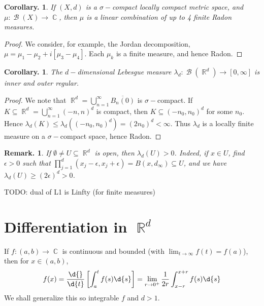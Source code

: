 \documentclass[11pt, a4paper]{memoir}
\DeclareMathOperator{\R}{{\mathbb{R}}}
\DeclareMathOperator{\C}{{\mathbb{C}}}
\theoremstyle{change}
\newtheorem{corollary}[theorem]{Corollary.}
\theoremstyle{plain}
\theoremstyle{nonumberplain}
\newtheorem{remark}{Remark.}
\newtheorem{proof}{Proof}
\DeclareMathOperator{\B}{{\mathcal{B}}}
\begin{document}
\begin{corollary}
    If $(X,d)$ is a $\sigma-$compact locally compact metric space, and $\mu:\B(X)\to\C$, then $\mu$ is a linear combination of up to 4 finite Radon measures.
\end{corollary}
\begin{proof}
    We consider, for example, the Jordan decomposition, $\mu=\mu_1-\mu_2+i[\mu_3-\mu_4]$.
    Each $\mu_k$ is a finite measure, and hence Radon.
\end{proof}
\begin{corollary}
    The $d-$dimensional Lebesgue measure $\lambda_d:\B(\R^d)\to[0,\infty]$ is inner and outer regular.
\end{corollary}
\begin{proof}
    We note that $\R^d=\bigcup_{n=1}^\infty\overline{B_n(0)}$ is $\sigma-$compact.
    If $K\subseteq\R^d=\bigcup_{n=1}^\infty(-n,n)^d$ is compact, then $K\subseteq(-n_0,n_0)^d$ for some $n_0$.
    Hence $\lambda_d(K)\leq\lambda_d((-n_0,n_0)^d)=(2n_0)^d<\infty$.
    Thus $\lambda_d$ is a locally finite measure on a $\sigma-$compact space, hence Radon.
\end{proof}
\begin{remark}
    If $\emptyset\neq U\subseteq\R^d$ is open, then $\lambda_d(U)>0$.
    Indeed, if $x\in U$, find $\epsilon>0$ such that $\prod_{j=1}^d(x_j-\epsilon,x_j+\epsilon)=B(x,d_\infty)\subseteq U$, and we have $\lambda_d(U)\geq(2\epsilon)^d>0$.
\end{remark}
TODO: dual of L1 is Linfty (for finite measures)
\section{Differentiation in \texorpdfstring{$\R^d$}{Rd}}
If $f:(a,b)\to\C$ is continuous and bounded (with $\lim_{t\to\infty}f(t)=f(a)$), then for $x\in(a,b)$,
\begin{equation*}
    f(x)=\frac{\d{}}{\d{t}}\left[\int_a^t f(s)\d{s}\right]=\lim_{r\to 0^+}\frac{1}{2r}\int_{x-r}^{x+r}f(s)\d{s}
\end{equation*}
We shall generalize this so integrable $f$ and $d>1$.
\end{document}
